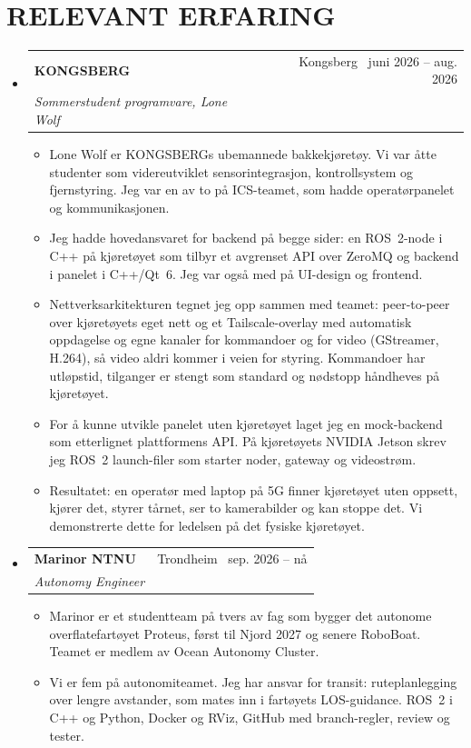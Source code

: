 \documentclass[a4paper,11pt]{article}
\makeatletter
\newlength{\entrysep}\setlength{\entrysep}{4pt}
\newlength{\hugup}\setlength{\hugup}{-3pt}
\newcommand{\resumeItem}[1]{\item\small{#1}}
\newcommand{\resumeSubheading}[4]{
  \vspace{\entrysep}\item
    \begin{tabular*}{\textwidth}[t]{l@{\extracolsep{\fill}}r}
      \textbf{#1} & {\color{dark-grey}\small #2}\vspace{1pt}\\
      \textit{#3} & {\color{dark-grey}\small #4}\\
    \end{tabular*}\vspace{\hugup}
}
\newcommand{\resumeSubHeadingListStart}{\begin{itemize}[leftmargin=0in, label={}]}
\newcommand{\resumeSubHeadingListEnd}{\end{itemize}}
\newcommand{\resumeItemListStart}{\begin{itemize}}
\newcommand{\resumeItemListEnd}{\end{itemize}}
\makeatother
\begin{document}
\section{RELEVANT ERFARING}
\resumeSubHeadingListStart

  \resumeSubheading
    {KONGSBERG}{Kongsberg \textbullet\ juni 2026 -- aug. 2026}
    {Sommerstudent programvare, Lone Wolf}{}
    \resumeItemListStart
      \resumeItem{Lone Wolf er KONGSBERGs ubemannede bakkekj{\o}ret{\o}y. Vi var {\aa}tte studenter som videreutviklet sensorintegrasjon, kontrollsystem og fjernstyring. Jeg var en av to p{\aa} ICS-teamet, som hadde operat{\o}rpanelet og kommunikasjonen.}
      \resumeItem{Jeg hadde hovedansvaret for backend p{\aa} begge sider: en ROS~2-node i C++ p{\aa} kj{\o}ret{\o}yet som tilbyr et avgrenset API over ZeroMQ og backend i panelet i C++/Qt~6. Jeg var ogs{\aa} med p{\aa} UI-design og frontend.}
      \resumeItem{Nettverksarkitekturen tegnet jeg opp sammen med teamet: peer-to-peer over kj{\o}ret{\o}yets eget nett og et Tailscale-overlay med automatisk oppdagelse og egne kanaler for kommandoer og for video (GStreamer, H.264), s{\aa} video aldri kommer i veien for styring. Kommandoer har utl{\o}pstid, tilganger er stengt som standard og n{\o}dstopp h{\aa}ndheves p{\aa} kj{\o}ret{\o}yet.}
      \resumeItem{For {\aa} kunne utvikle panelet uten kj{\o}ret{\o}yet laget jeg en mock-backend som etterlignet plattformens API. P{\aa} kj{\o}ret{\o}yets NVIDIA Jetson skrev jeg ROS~2 launch-filer som starter noder, gateway og videostr{\o}m.}
      \resumeItem{Resultatet: en operat{\o}r med laptop p{\aa} 5G finner kj{\o}ret{\o}yet uten oppsett, kj{\o}rer det, styrer t{\aa}rnet, ser to kamerabilder og kan stoppe det. Vi demonstrerte dette for ledelsen p{\aa} det fysiske kj{\o}ret{\o}yet.}
    \resumeItemListEnd

  \resumeSubheading
    {Marinor NTNU}{Trondheim \textbullet\ sep. 2026 -- n{\aa}}
    {Autonomy Engineer}{}
    \resumeItemListStart
      \resumeItem{Marinor er et studentteam p{\aa} tvers av fag som bygger det autonome overflatefart{\o}yet Proteus, f{\o}rst til Njord 2027 og senere RoboBoat. Teamet er medlem av Ocean Autonomy Cluster.}
      \resumeItem{Vi er fem p{\aa} autonomiteamet. Jeg har ansvar for transit: ruteplanlegging over lengre avstander, som mates inn i fart{\o}yets LOS-guidance. ROS~2 i C++ og Python, Docker og RViz, GitHub med branch-regler, review og tester.}
    \resumeItemListEnd

\resumeSubHeadingListEnd
\end{document}
